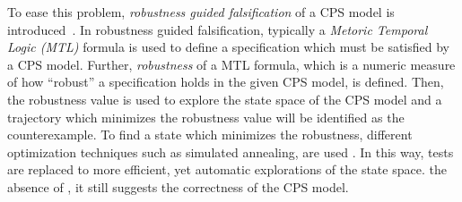To ease this problem, \emph{robustness guided falsification} of a CPS model is introduced~\cite{TLF_CPS_2013}.
In robustness guided falsification, typically a \emph{Metoric Temporal Logic (MTL)} formula is used to define a specification which must be satisfied by a CPS model.
Further, \emph{robustness} of a MTL formula, which is a numeric measure of how ``robust'' a specification holds in the given CPS model, is defined.
\DIFaddbegin {}\DIFaddend Then, the robustness value is used to explore the state space of the CPS model and a trajectory which minimizes the robustness value will be identified as the counterexample.
To find a state which minimizes the robustness, different optimization techniques such as simulated annealing, are used \DIFaddbegin \DIFadd{\mbox{%
\cite{}
}%
}\DIFaddend .
In this way, tests are replaced to more efficient, yet automatic explorations of the state space.
\DIFdelbegin {}\DIFdelend %
\DIFaddbegin {}\DIFaddend the absence of \DIFdelbegin {}\DIFdelend \DIFaddbegin {}\DIFaddend , it still \DIFdelbegin {}\DIFdelend suggests the correctness of the CPS model.
\DIFdelbegin {}\DIFdelend %

